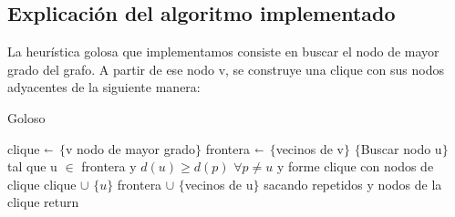 \subsection{Explicación del algoritmo implementado}
La heurística golosa que implementamos consiste en buscar el nodo de mayor grado del grafo.
A partir de ese nodo v, se construye una clique con sus nodos adyacentes de la siguiente manera:

\begin{algorithm}[H]
\caption{Goloso}\label{ej2}
\begin{algorithmic}[1]
	\State clique  $\shortleftarrow$ $\{$v nodo de mayor grado$\}$
	\State frontera $\shortleftarrow$ $\{$vecinos de v$\}$
		\State $\{$Buscar nodo u$\}$ tal que u $\in$ frontera y $ d(u) \ge d(p)$ $ \forall p \neq u $ y forme clique con nodos de clique
		\State clique $\cup$ $\{u\}$
		\State frontera $\cup$ $\{$vecinos de u$\}$ sacando repetidos y nodos de la clique
	\EndWhile
	\State return 
\EndProcedure
\end{algorithmic}
\end{algorithm}
